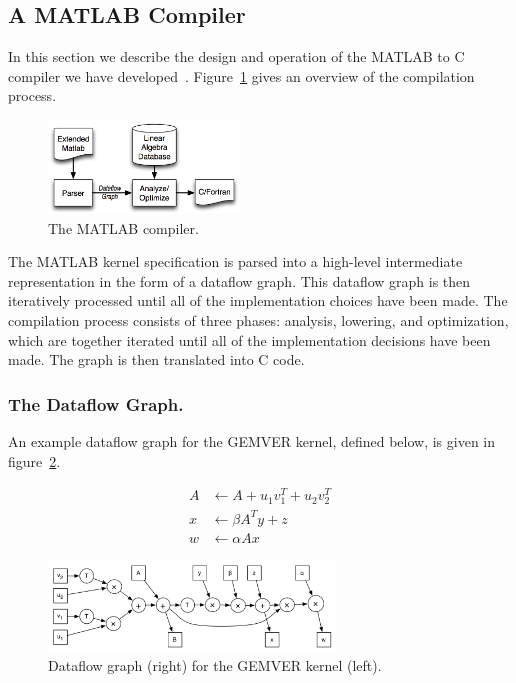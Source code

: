 \documentclass[runningheads]{llncs}
\begin{document}
\subsection{A MATLAB Compiler}
\label{sec:matlab}
%
In this section we describe the design and operation of the MATLAB to C compiler we have developed~\cite{Siek}.    Figure~\ref{fig:compiler} gives an overview of the compilation process. 
%
\begin{figure}
\vspace{-.2in}
\centering
\includegraphics[width=2in]{figures/compile.png}
\caption{The MATLAB compiler.}
\label{fig:compiler}
\vspace{-.3in}
\end{figure}
The MATLAB kernel specification is parsed into a high-level intermediate representation in the form of a dataflow graph.  This dataflow graph is then iteratively processed until all of the implementation choices have been made.  The compilation process consists of three phases: analysis, lowering, and optimization, which are together iterated until all of the implementation decisions have been made.  The graph is then translated into C code.

\subsubsection{The Dataflow Graph.}

An example dataflow graph for the GEMVER kernel, defined below, is given in figure~\ref{fig:gemver-dataflow}.
\begin{figure}[ht]
\begin{minipage}{.3\textwidth}
\begin{align*}
  A &\gets A + u_1 v_1^T + u_2 v_2^T \\[-0.5ex]
  x &\gets \beta A^T y + z \\[-0.5ex]
  w &\gets \alpha A x
\end{align*} 
\end{minipage}
\begin{minipage}{.6\textwidth}
\includegraphics[width=3in]{figures/gemver-dataflow.png}
\end{minipage}
\caption{Dataflow graph (right) for the GEMVER kernel (left).}
\label{fig:gemver-dataflow}
\end{figure}
\end{document}
